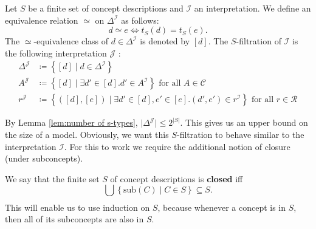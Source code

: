 \begin{definition}[$S$-filtration]
	Let $S$ be a finite set of concept descriptions and $\mathcal{I}$ an interpretation.
	We define an equivalence relation $\simeq$ on $\Delta^{\mathcal{I}}$ as follows:
	\[
		d \simeq e \iff t_S(d) = t_S(e)
	.\]
	The $\simeq$-equivalence class of  $d \in \Delta^{\mathcal{I}}$ is denoted by $\left[ d \right]$.
	The $S$-filtration of $\mathcal{I}$ is the following interpretation $\mathcal{J}$ :
	\begin{align*}
		\Delta^{\mathcal{J}} &\coloneqq \left\{ [d] \mid d \in \Delta^{\mathcal{I}} \right\} \\
		A^\mathcal{J} &\coloneqq \left\{ [d] \mid \exists d' \in [d]. d' \in A^{\mathcal{I}} \right\} \text{ for all } A \in \mathscr{C} \\
		r^\mathcal{J} &\coloneqq \left\{ \left( [d],[e] \right) \mid \exists d' \in [d], e' \in [e]. (d',e') \in r^\mathcal{I}\right\} \text{ for all } r \in \mathscr{R}
	\end{align*}
\end{definition}
\begin{note}
	By Lemma \ref{lem:number of s-types}, $\lvert \Delta^{\mathcal{J}} \rvert \leq 2^{\lvert S \rvert}$.
	This gives us an upper bound on the size of a model.
	Obviously, we want this $S$-filtration to behave similar to the interpretation $\mathcal{I}$.
	For this to work we require the additional notion of closure (under subconcepts).
\end{note}

We say that the finite set $S$ of concept descriptions is \textbf{closed} iff
\[
	\bigcup_{} \left\{ \text{sub}(C) \mid C \in S \right\} \subseteq S
.\]
This will enable us to use induction on $S$, because whenever a concept is in $S$, then all of its subconcepts are also in $S$.

